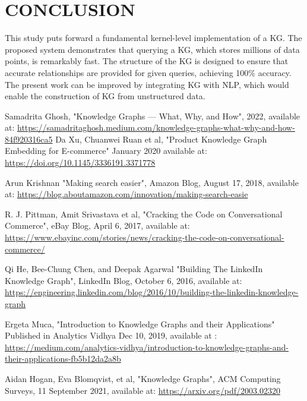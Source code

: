\documentclass[conference]{IEEEtran}
\begin{document}
\section{CONCLUSION}
This study puts forward a fundamental kernel-level implementation of a KG. 
The proposed system demonstrates that querying a KG, which stores millions of data points, is remarkably fast. 
The structure of the KG is designed to ensure that accurate relationships are provided for given queries, achieving 100\% accuracy.
\\
The present work can be improved by integrating KG with NLP, which would enable the construction of KG from unstructured data.


\begin{thebibliography}{00}

 Samadrita Ghosh, "Knowledge Graphs — What, Why, and How", 2022, available at: \url{https://samadritaghosh.medium.com/knowledge-graphs-what-why-and-how-84f920316ca5}
 Da Xu, Chuanwei Ruan et al, "Product Knowledge Graph Embedding for E-commerce"  January 2020 available at: \url{https://doi.org/10.1145/3336191.3371778}

 Arun Krishnan "Making search easier", Amazon Blog, August 17, 2018, available at: \url{https://blog.aboutamazon.com/innovation/making-search-easie}

 R. J. Pittman, Amit Srivastava et al, "Cracking the Code on Conversational Commerce", eBay Blog,  April 6, 2017, available at:  \url{https://www.ebayinc.com/stories/news/cracking-the-code-on-conversational-commerce/}

Qi He, Bee-Chung Chen, and Deepak Agarwal "Building The
LinkedIn Knowledge Graph", LinkedIn Blog,  October 6, 2016, available at: \url{https://engineering.linkedin.com/blog/2016/10/building-the-linkedin-knowledge-graph}


 Ergeta Muca, "Introduction to Knowledge Graphs and their Applications" Published in
Analytics Vidhya Dec 10, 2019, available 
at : \url{https://medium.com/analytics-vidhya/introduction-to-knowledge-graphs-and-their-applications-fb5b12da2a8b}

 Aidan Hogan, Eva Blomqvist, et al, "Knowledge Graphs", ACM
Computing Surveys, 11 September 2021,  available at: \url{https://arxiv.org/pdf/2003.02320}


\end{thebibliography}
\end{document}
